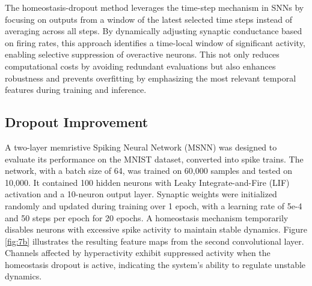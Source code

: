 \noindent The homeostasis-dropout method leverages the time-step mechanism in SNNs by focusing on outputs from a window of the latest selected time steps instead of averaging across all steps. By dynamically adjusting synaptic conductance based on firing rates, this approach identifies a time-local window of significant activity, enabling selective suppression of overactive neurons. This not only reduces computational costs by avoiding redundant evaluations but also enhances robustness and prevents overfitting by emphasizing the most relevant temporal features during training and inference.

\subsection{Dropout Improvement}



\noindent A two-layer memristive Spiking Neural Network (MSNN) was designed to evaluate its performance on the MNIST dataset, converted into spike trains. The network, with a batch size of 64, was trained on 60,000 samples and tested on 10,000. It contained 100 hidden neurons with Leaky Integrate-and-Fire (LIF) activation and a 10-neuron output layer. Synaptic weights were initialized randomly and updated during training over 1 epoch, with a learning rate of 5e-4 and 50 steps per epoch for 20 epochs. A homeostasis mechanism temporarily disables neurons with excessive spike activity to maintain stable dynamics. Figure \ref{fig:7b} illustrates the resulting feature maps from the second convolutional layer. Channels affected by hyperactivity exhibit suppressed activity when the homeostasis dropout is active, indicating the system's ability to regulate unstable dynamics.\\


